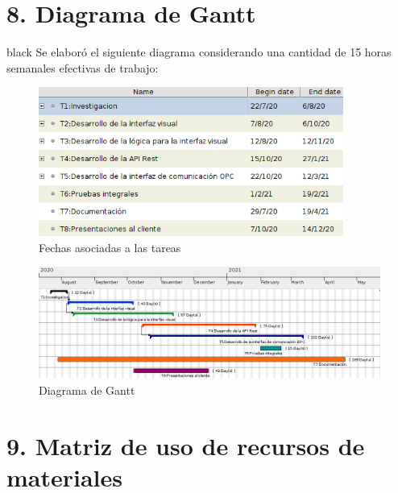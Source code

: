 \documentclass[11pt]{charter}
\begin{document}
\section{8. Diagrama de Gantt}
\label{sec:gantt}

\begin{consigna}{black}
Se elaboró el siguiente diagrama considerando una cantidad de 15 horas semanales efectivas de trabajo:

\begin{figure}[H]
 \centering
 \includegraphics[width=10cm]{gantt_1.png}
 \caption{Fechas asociadas a las tareas}
\end{figure}



\begin{figure}[H]
 \centering
 \includegraphics[width=17cm]{gantt_2.png}
 \caption{Diagrama de Gantt}
 \label{figure:Diagrama de Gantt}
\end{figure}

\end{consigna}

\section{9. Matriz de uso de recursos de materiales}
\label{sec:recursos}
\end{document}
